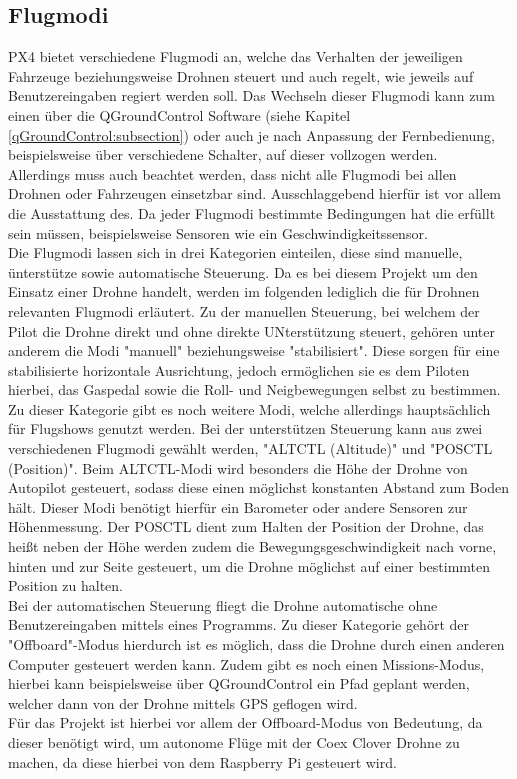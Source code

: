 \subsection{Flugmodi}
PX4 bietet verschiedene Flugmodi an, welche das Verhalten der jeweiligen Fahrzeuge beziehungsweise Drohnen steuert und auch regelt, wie jeweils auf Benutzereingaben regiert werden soll. Das Wechseln dieser Flugmodi kann zum einen über die QGroundControl Software (siehe Kapitel \ref{qGroundControl:subsection}) oder auch je nach Anpassung der Fernbedienung, beispielsweise über verschiedene Schalter, auf dieser vollzogen werden. \\
Allerdings muss auch beachtet werden, dass nicht alle Flugmodi bei allen Drohnen oder Fahrzeugen einsetzbar sind. Ausschlaggebend hierfür ist vor allem die Ausstattung des. Da jeder Flugmodi bestimmte Bedingungen hat die erfüllt sein müssen, beispielsweise Sensoren wie ein Geschwindigkeitssensor. \\
Die Flugmodi lassen sich in drei Kategorien einteilen, diese sind manuelle, ünterstütze sowie automatische Steuerung.
Da es bei diesem Projekt um den Einsatz einer Drohne handelt, werden im folgenden lediglich die für Drohnen relevanten Flugmodi erläutert.
Zu der manuellen Steuerung, bei welchem der Pilot die Drohne direkt und ohne direkte UNterstützung steuert, gehören unter anderem die Modi "manuell" beziehungsweise "stabilisiert". Diese sorgen für eine stabilisierte horizontale Ausrichtung, jedoch ermöglichen sie es dem Piloten hierbei, das Gaspedal sowie die Roll- und Neigbewegungen selbst zu bestimmen. Zu dieser Kategorie gibt es noch weitere Modi, welche allerdings hauptsächlich für Flugshows genutzt werden.
Bei der unterstützen Steuerung kann aus zwei verschiedenen Flugmodi gewählt werden, "ALTCTL (Altitude)" und "POSCTL (Position)". Beim ALTCTL-Modi wird besonders die Höhe der Drohne von Autopilot gesteuert, sodass diese einen möglichst konstanten Abstand zum Boden hält. Dieser Modi benötigt hierfür ein Barometer oder andere Sensoren zur Höhenmessung.
Der POSCTL dient zum Halten der Position der Drohne, das heißt neben der Höhe werden zudem die Bewegungsgeschwindigkeit nach vorne, hinten und zur Seite gesteuert, um die Drohne möglichst auf einer bestimmten Position zu halten.\\
Bei der automatischen Steuerung fliegt die Drohne automatische ohne Benutzereingaben mittels eines Programms. Zu dieser Kategorie gehört der "Offboard"-Modus hierdurch ist es möglich, dass die Drohne durch einen anderen Computer gesteuert werden kann. Zudem gibt es noch einen Missions-Modus, hierbei kann beispielsweise über QGroundControl ein Pfad geplant werden, welcher dann von der Drohne mittels GPS geflogen wird. \\
Für das Projekt ist hierbei vor allem der Offboard-Modus von Bedeutung, da dieser benötigt wird, um autonome Flüge mit der Coex Clover Drohne zu machen, da diese hierbei von dem Raspberry Pi gesteuert wird. \cite[vgl.][]{flight-modes}


